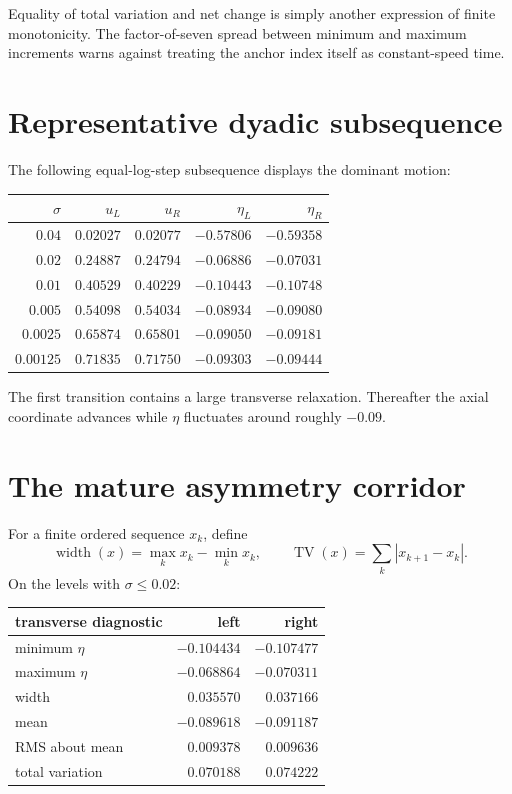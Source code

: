 \documentclass[12pt]{article}
\theoremstyle{remark}\newtheorem{remark}[theorem]{Remark}
\newcommand{\TV}{\operatorname{TV}}
\begin{document}
Equality of total variation and net change is simply another expression of
finite monotonicity.  The factor-of-seven spread between minimum and maximum
increments warns against treating the anchor index itself as constant-speed
time.

\section{Representative dyadic subsequence}

The following equal-log-step subsequence displays the dominant motion:
\begin{center}
\small
\begin{tabular}{rrrrr}
\toprule
$\sigma$ & $u_L$ & $u_R$ & $\eta_L$ & $\eta_R$\\
\midrule
$0.04$ & $0.02027$ & $0.02077$ & $-0.57806$ & $-0.59358$\\
$0.02$ & $0.24887$ & $0.24794$ & $-0.06886$ & $-0.07031$\\
$0.01$ & $0.40529$ & $0.40229$ & $-0.10443$ & $-0.10748$\\
$0.005$ & $0.54098$ & $0.54034$ & $-0.08934$ & $-0.09080$\\
$0.0025$ & $0.65874$ & $0.65801$ & $-0.09050$ & $-0.09181$\\
$0.00125$ & $0.71835$ & $0.71750$ & $-0.09303$ & $-0.09444$\\
\bottomrule
\end{tabular}
\end{center}
The first transition contains a large transverse relaxation.  Thereafter the
axial coordinate advances while $\eta$ fluctuates around roughly $-0.09$.

\section{The mature asymmetry corridor}

For a finite ordered sequence $x_k$, define
\begin{equation}
 \operatorname{width}(x)=\max_kx_k-\min_kx_k,
 \qquad
 \TV(x)=\sum_k|x_{k+1}-x_k|.
\end{equation}
On the levels with $\sigma\le0.02$:
\begin{center}
\begin{tabular}{lrr}
\toprule
transverse diagnostic & left & right\\
\midrule
minimum $\eta$ & $-0.104434$ & $-0.107477$\\
maximum $\eta$ & $-0.068864$ & $-0.070311$\\
width & $0.035570$ & $0.037166$\\
mean & $-0.089618$ & $-0.091187$\\
RMS about mean & $0.009378$ & $0.009636$\\
total variation & $0.070188$ & $0.074222$\\
\bottomrule
\end{tabular}
\end{center}
\end{document}
